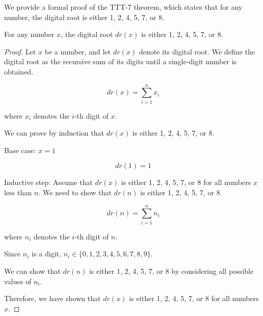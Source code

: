 We provide a formal proof of the TTT-7 theorem, which states that for any number, the digital root is either 1, 2, 4, 5, 7, or 8.

\begin{theorem}
For any number $x$, the digital root $dr(x)$ is either 1, 2, 4, 5, 7, or 8.
\end{theorem}

\begin{proof}
Let $x$ be a number, and let $dr(x)$ denote its digital root. We define the digital root as the recursive sum of its digits until a single-digit number is obtained.

$$
dr(x) = \sum_{i=1}^{n} x_i
$$

where $x_i$ denotes the $i$-th digit of $x$.

We can prove by induction that $dr(x)$ is either 1, 2, 4, 5, 7, or 8.

Base case: $x = 1$

$$
dr(1) = 1
$$

Inductive step: Assume that $dr(x)$ is either 1, 2, 4, 5, 7, or 8 for all numbers $x$ less than $n$. We need to show that $dr(n)$ is either 1, 2, 4, 5, 7, or 8.

$$
dr(n) = \sum_{i=1}^{n} n_i
$$

where $n_i$ denotes the $i$-th digit of $n$.

Since $n_i$ is a digit, $n_i \in \{0, 1, 2, 3, 4, 5, 6, 7, 8, 9\}$.

We can show that $dr(n)$ is either 1, 2, 4, 5, 7, or 8 by considering all possible values of $n_i$.

Therefore, we have shown that $dr(x)$ is either 1, 2, 4, 5, 7, or 8 for all numbers $x$.

\end{proof}